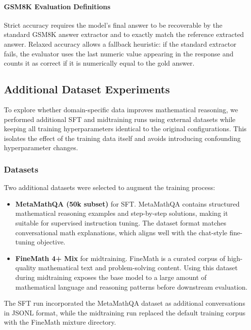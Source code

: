 \paragraph{GSM8K Evaluation Definitions}
\label{sec:gsm8k_eval_def}

Strict accuracy requires the model’s final answer to be recoverable by the standard GSM8K
answer extractor and to exactly match the reference extracted answer. Relaxed accuracy
allows a fallback heuristic: if the standard extractor fails, the evaluator uses the last
numeric value appearing in the response and counts it as correct if it is numerically equal
to the gold answer.



\subsection{Additional Dataset Experiments}

To explore whether domain-specific data improves mathematical reasoning, we performed
additional SFT and midtraining runs using external datasets while keeping all training
hyperparameters identical to the original configurations. This isolates the effect of the
training data itself and avoids introducing confounding hyperparameter changes.

\subsubsection{Datasets}

Two additional datasets were selected to augment the training process:

\begin{itemize}
\item \textbf{MetaMathQA (50k subset)} for SFT.  
MetaMathQA contains structured mathematical reasoning examples and step-by-step
solutions, making it suitable for supervised instruction tuning. The dataset format
matches conversational math explanations, which aligns well with the chat-style
fine-tuning objective.

\item \textbf{FineMath 4+ Mix} for midtraining.  
FineMath is a curated corpus of high-quality mathematical text and problem-solving
content. Using this dataset during midtraining exposes the base model to a large amount
of mathematical language and reasoning patterns before downstream evaluation.
\end{itemize}

The SFT run incorporated the MetaMathQA dataset as additional conversations in JSONL
format, while the midtraining run replaced the default training corpus with the
FineMath mixture directory.

